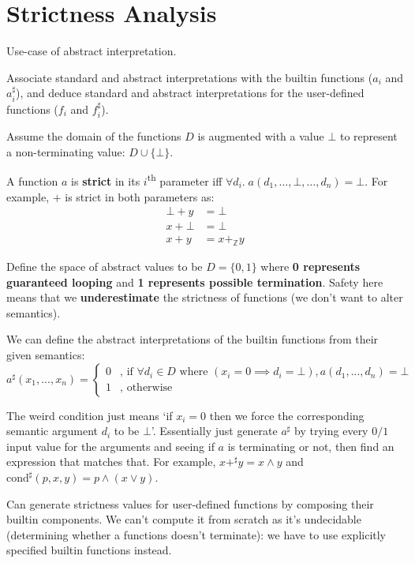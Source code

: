 \documentclass[a4paper, 11pt]{article}
\begin{document}
\section*{Strictness Analysis}
{
    Use-case of abstract interpretation.

    Associate standard and abstract interpretations with the builtin functions (\(a_i\) and \(a^\sharp_i\)), and deduce standard and abstract interpretations for the user-defined functions (\(f_i\) and \(f^\sharp_i\)).

    Assume the domain of the functions \(D\) is augmented with a value \(\bot\) to represent a non-terminating value: \(D \cup \{\bot\}\).

    A function \(a\) is \textbf{strict} in its \(i\)\textsuperscript{th} parameter iff \(\forall d_i.\; a(d_1, \dots, \bot, \dots, d_n) = \bot\). For example, \(+\) is strict in both parameters as:
    \begin{align*}
    \bot + y &= \bot \\
    x + \bot &= \bot \\
    x + y    &= x +_\mathbb{Z} y
    \end{align*}

    Define the space of abstract values to be \(D = \{0, 1\}\) where \textbf{0 represents guaranteed looping} and \textbf{1 represents possible termination}. Safety here means that we \textbf{underestimate} the strictness of functions (we don't want to alter semantics).

    We can define the abstract interpretations of the builtin functions from their given semantics:
    \begin{equation*}
    a^\sharp(x_1, ..., x_n) = \begin{cases}
        0 & \text{, if }\forall d_i \in D \text{ where }(x_i = 0 \implies d_i = \bot), a(d_1, ..., d_n) = \bot \\
        1 & \text{, otherwise}
    \end{cases}
    \end{equation*}

    The weird condition just means `if \(x_i = 0\) then we force the corresponding semantic argument \(d_i\) to be \(\bot\)'. Essentially just generate \(a^\sharp\) by trying every \(0/1\) input value for the arguments and seeing if \(a\) is terminating or not, then find an expression that matches that. For example, \(x +^\sharp y = x \wedge y\) and \(\text{cond}^\sharp(p, x, y) = p \wedge (x \vee y)\).

    Can generate strictness values for user-defined functions by composing their builtin components. We can't compute it from scratch as it's undecidable (determining whether a functions doesn't terminate): we have to use explicitly specified builtin functions instead.

}
\end{document}
